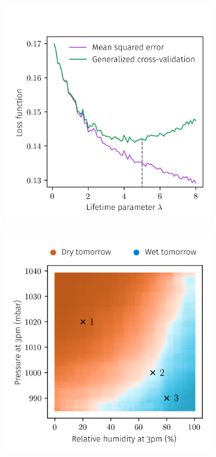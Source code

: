 \begin{figure}[ht]
  \centering
  \begin{subfigure}{0.54\textwidth}
    \centering
    \includegraphics[scale=0.77]{graphics/weather_gcv.png}%
  \end{subfigure}
  \begin{subfigure}{0.45\textwidth}
    \centering
    \includegraphics[scale=0.77]{graphics/weather_forest_design.png}%

\end{subfigure}
\end{figure}
